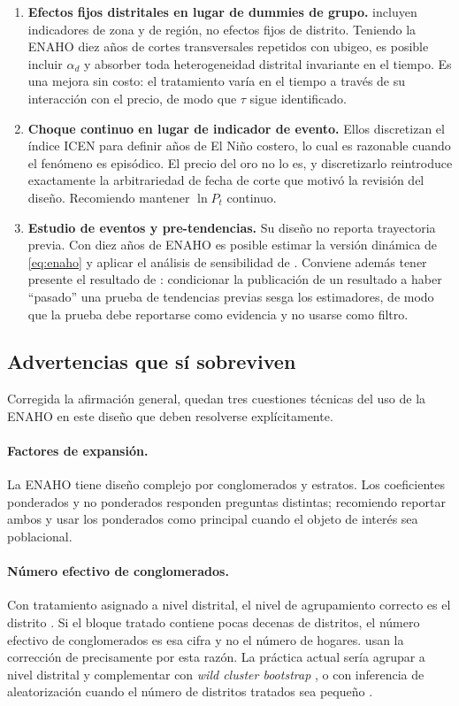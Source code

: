 \documentclass[11pt,a4paper]{article}
\begin{document}
\begin{enumerate}[leftmargin=1.6em,itemsep=3pt]
\item \textbf{Efectos fijos distritales en lugar de dummies de grupo.} \citet{pecastaing2020} incluyen indicadores de zona y de región, no efectos fijos de distrito. Teniendo la ENAHO diez años de cortes transversales repetidos con ubigeo, es posible incluir $\alpha_d$ y absorber toda heterogeneidad distrital invariante en el tiempo. Es una mejora sin costo: el tratamiento varía en el tiempo a través de su interacción con el precio, de modo que $\tau$ sigue identificado.
\item \textbf{Choque continuo en lugar de indicador de evento.} Ellos discretizan el índice ICEN para definir años de El Niño costero, lo cual es razonable cuando el fenómeno es episódico. El precio del oro no lo es, y discretizarlo reintroduce exactamente la arbitrariedad de fecha de corte que motivó la revisión del diseño. Recomiendo mantener $\ln P_t$ continuo.
\item \textbf{Estudio de eventos y pre-tendencias.} Su diseño no reporta trayectoria previa. Con diez años de ENAHO es posible estimar la versión dinámica de \eqref{eq:enaho} y aplicar el análisis de sensibilidad de \citet{rambachan2023}. Conviene además tener presente el resultado de \citet{roth2022}: condicionar la publicación de un resultado a haber ``pasado'' una prueba de tendencias previas sesga los estimadores, de modo que la prueba debe reportarse como evidencia y no usarse como filtro.
\end{enumerate}

\subsection{Advertencias que sí sobreviven}

Corregida la afirmación general, quedan tres cuestiones técnicas del uso de la ENAHO en este diseño que deben resolverse explícitamente.

\paragraph{Factores de expansión.} La ENAHO tiene diseño complejo por conglomerados y estratos. Los coeficientes ponderados y no ponderados responden preguntas distintas; recomiendo reportar ambos y usar los ponderados como principal cuando el objeto de interés sea poblacional.

\paragraph{Número efectivo de conglomerados.} Con tratamiento asignado a nivel distrital, el nivel de agrupamiento correcto es el distrito \citep{abadie2023}. Si el bloque tratado contiene pocas decenas de distritos, el número efectivo de conglomerados es esa cifra y no el número de hogares. \citet{pecastaing2020} usan la corrección de \citet{donald2007} precisamente por esta razón. La práctica actual sería agrupar a nivel distrital y complementar con \emph{wild cluster bootstrap} \citep{cameron2008,mackinnon2023}, o con inferencia de aleatorización cuando el número de distritos tratados sea pequeño \citep{ferman2019}.
\end{document}
